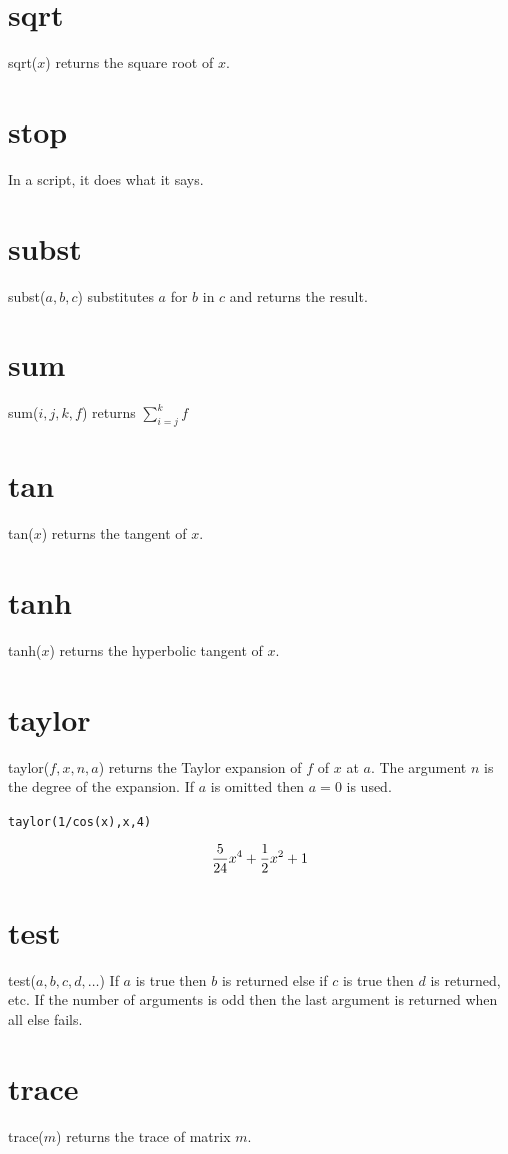 \documentclass[12pt]{book}
\begin{document}
\section*{sqrt}
sqrt($x$) returns the square root of $x$.

\section*{stop}
In a script, it does what it says.

\section*{subst}
subst($a,b,c$) substitutes $a$ for $b$ in $c$ and returns the result.

\section*{sum}
sum($i,j,k,f$) returns $\displaystyle\sum_{i=j}^k f$

\section*{tan}
tan($x$) returns the tangent of $x$.

\section*{tanh}
tanh($x$) returns the hyperbolic tangent of $x$.

\section*{taylor}
taylor($f,x,n,a$) returns the Taylor expansion of $f$ of $x$ at $a$.
The argument $n$ is the degree of the expansion.
If $a$ is omitted then $a=0$ is used.

\medskip
{\tt taylor(1/cos(x),x,4)}

$${5\over24}x^4+{1\over2}x^2+1$$

\section*{test}
test($a,b,c,d,\ldots$)
If $a$ is true then $b$ is returned else if $c$ is true then $d$ is returned, etc.
If the number of arguments is odd then the last argument is returned when all else fails.

\section*{trace}
trace($m$) returns the trace of matrix $m$.
\end{document}
